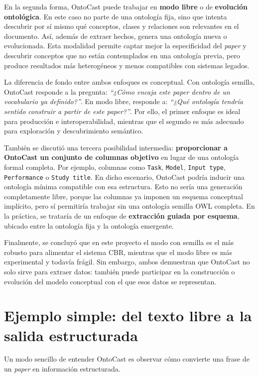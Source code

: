 \documentclass[12pt]{article}
\begin{document}
En la segunda forma, OntoCast puede trabajar en \textbf{modo libre} o de \textbf{evolución ontológica}. En este caso no parte de una ontología fija, sino que intenta descubrir por sí mismo qué conceptos, clases y relaciones son relevantes en el documento. Así, además de extraer hechos, genera una ontología nueva o evolucionada. Esta modalidad permite captar mejor la especificidad del \textit{paper} y descubrir conceptos que no están contemplados en una ontología previa, pero produce resultados más heterogéneos y menos compatibles con sistemas legados.

La diferencia de fondo entre ambos enfoques es conceptual. Con ontología semilla, OntoCast responde a la pregunta: \textit{``¿Cómo encaja este \textit{paper} dentro de un vocabulario ya definido?''}. En modo libre, responde a: \textit{``¿Qué ontología tendría sentido construir a partir de este \textit{paper}?''}. Por ello, el primer enfoque es ideal para producción e interoperabilidad, mientras que el segundo es más adecuado para exploración y descubrimiento semántico.

También se discutió una tercera posibilidad intermedia: \textbf{proporcionar a OntoCast un conjunto de columnas objetivo} en lugar de una ontología formal completa. Por ejemplo, columnas como \texttt{Task}, \texttt{Model}, \texttt{Input type}, \texttt{Performance} o \texttt{Study title}. En dicho escenario, OntoCast podría inducir una ontología mínima compatible con esa estructura. Esto no sería una generación completamente libre, porque las columnas ya imponen un esquema conceptual implícito, pero sí permitiría trabajar sin una ontología semilla OWL completa. En la práctica, se trataría de un enfoque de \textbf{extracción guiada por esquema}, ubicado entre la ontología fija y la ontología emergente.

Finalmente, se concluyó que en este proyecto el modo con semilla es el más robusto para alimentar el sistema CBR, mientras que el modo libre es más experimental y todavía frágil. Sin embargo, ambos demuestran que OntoCast no solo sirve para extraer datos: también puede participar en la construcción o evolución del modelo conceptual con el que esos datos se representan.

\section{Ejemplo simple: del texto libre a la salida estructurada}

Un modo sencillo de entender OntoCast es observar cómo convierte una frase de un \textit{paper} en información estructurada.
\end{document}
